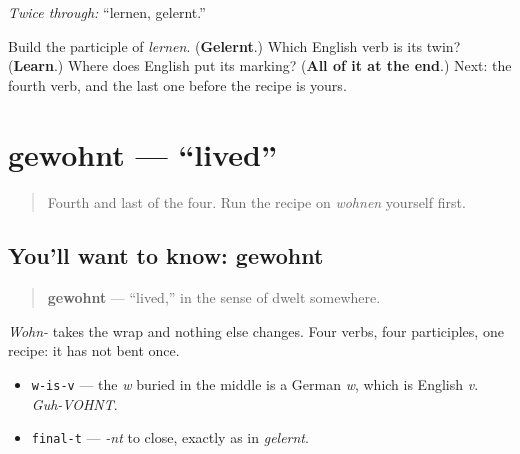 \emph{Twice through:} \textquotedblleft{}lernen, gelernt.\textquotedblright{}

\begin{tcolorbox}[breakable,colback=teal!4,colframe=teal!35!black,title={Before you move on}]
Build the participle of \emph{lernen}. (\textbf{Gelernt}.) Which English verb is its twin? (\textbf{Learn}.) Where does English put its marking? (\textbf{All of it at the end}.) Next: the fourth verb, and the last one before the recipe is yours.
\end{tcolorbox}
\section[gewohnt]{gewohnt — \textquotedblleft{}lived\textquotedblright{}}

\label{lesson:GE-C15-gewohnt}



\begin{quote}
Fourth and last of the four. Run the recipe on \emph{wohnen} yourself first.
\end{quote}

\subsection*{You'll want to know: gewohnt}
\begin{quote}
\textbf{gewohnt} — \textquotedblleft{}lived,\textquotedblright{} in the sense of dwelt somewhere.
\end{quote}

\emph{Wohn-} takes the wrap and nothing else changes. Four verbs, four participles, one recipe: it has not bent once.

\begin{sounds}
\begin{itemize}
\raggedright
  \item \texttt{w-is-v} — the \emph{w} buried in the middle is a German \emph{w}, which is English \emph{v}. \emph{Guh-VOHNT}.
  \item \texttt{final-t} — \emph{-nt} to close, exactly as in \emph{gelernt}.
\end{itemize}
\end{sounds}

